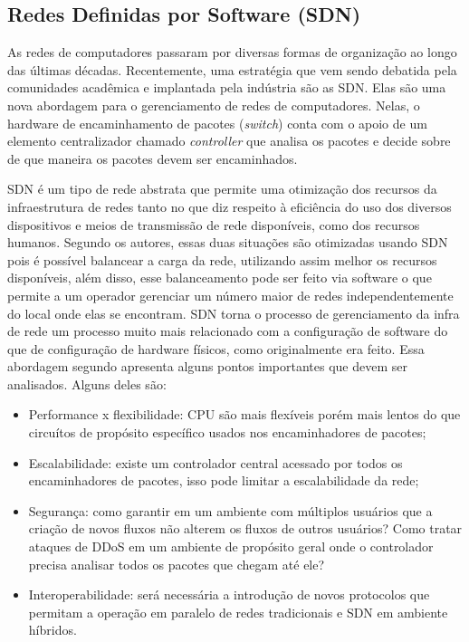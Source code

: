 \documentclass[12pt]{article}
\begin{document}
\subsection{Redes Definidas por Software (SDN)}

As redes de computadores passaram por diversas formas de organização ao longo das últimas décadas. Recentemente, uma estratégia que vem sendo debatida pela comunidades acadêmica e implantada pela indústria são as SDN. Elas são uma nova abordagem para o gerenciamento de redes de computadores. Nelas, o hardware de encaminhamento de pacotes (\textit{switch}) conta com o apoio de um elemento centralizador chamado \textit{controller} que analisa os pacotes e decide sobre de que maneira os pacotes devem ser encaminhados. 

SDN é um tipo de rede abstrata que permite uma otimização dos recursos da infraestrutura de redes tanto no que diz respeito à eficiência do uso dos diversos dispositivos e meios de transmissão de rede disponíveis, como dos recursos humanos. Segundo os autores, essas duas situações são otimizadas usando SDN pois é possível balancear a carga da rede, utilizando assim melhor os recursos disponíveis, além disso, esse balanceamento pode ser feito via software o que permite a um operador gerenciar um número maior de redes independentemente do local onde elas se encontram. SDN torna o processo de gerenciamento da infra de rede um processo muito mais relacionado com a configuração de software do que de configuração de hardware físicos, como originalmente era feito. Essa abordagem segundo  \cite{Sezer_et_al_2013} apresenta alguns pontos importantes que devem ser analisados. Alguns deles são:

 \begin{itemize}
   \item Performance x flexibilidade:  CPU são mais flexíveis porém mais lentos do que circuítos de propósito específico usados nos encaminhadores de pacotes;
   \item Escalabilidade: existe um controlador central acessado por todos os encaminhadores de pacotes, isso pode limitar a escalabilidade da rede; 
   \item Segurança: como garantir em um ambiente com múltiplos usuários que a criação de novos fluxos não alterem os fluxos de outros usuários? Como tratar ataques de DDoS em um ambiente de propósito geral onde o controlador precisa analisar todos os pacotes que chegam até ele?
   \item Interoperabilidade: será necessária a introdução de novos protocolos que permitam a operação em paralelo de redes tradicionais e SDN em ambiente híbridos.
 \end{itemize}
\end{document}
